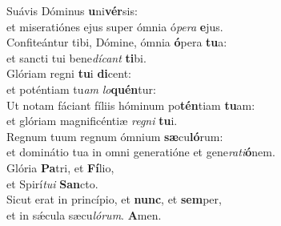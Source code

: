\evenverse Suávis Dóminus \textbf{u}ni\textbf{vér}sis:~\*\\
\evenverse et miseratiónes ejus super ómnia ó\textit{pe}\textit{ra} \textbf{e}jus.\\
\oddverse Confiteántur tibi, Dómine, ómnia \textbf{ó}pera \textbf{tu}a:~\*\\
\oddverse et sancti tui bene\textit{dí}\textit{cant} \textbf{ti}bi.\\
\evenverse Glóriam regni \textbf{tu}i \textbf{di}cent:~\*\\
\evenverse et poténtiam tu\textit{am} \textit{lo}\textbf{quén}tur:\\
\oddverse Ut notam fáciant fíliis hóminum po\textbf{tén}tiam \textbf{tu}am:~\*\\
\oddverse et glóriam magnificéntiæ \textit{re}\textit{gni} \textbf{tu}i.\\
\evenverse Regnum tuum regnum ómnium \textbf{sæ}cu\textbf{ló}rum:~\*\\
\evenverse et dominátio tua in omni generatióne et gene\textit{ra}\textit{ti}\textbf{ó}nem.\\
\oddverse Glória \textbf{Pa}tri, et \textbf{Fí}lio,~\*\\
\oddverse et Spirí\textit{tu}\textit{i} \textbf{San}cto.\\
\evenverse Sicut erat in princípio, et \textbf{nunc}, et \textbf{sem}per,~\*\\
\evenverse et in sǽcula sæcu\textit{ló}\textit{rum}. \textbf{A}men.\\
